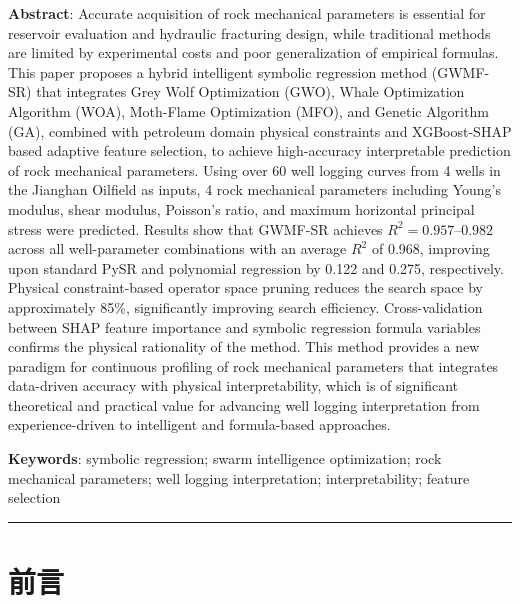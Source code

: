 \documentclass[a4paper,12pt]{ctexart}
\begin{document}
\vspace{0.5em}
\noindent\textbf{Abstract}: Accurate acquisition of rock mechanical parameters is essential for reservoir evaluation and hydraulic fracturing design, while traditional methods are limited by experimental costs and poor generalization of empirical formulas. This paper proposes a hybrid intelligent symbolic regression method (GWMF-SR) that integrates Grey Wolf Optimization (GWO), Whale Optimization Algorithm (WOA), Moth-Flame Optimization (MFO), and Genetic Algorithm (GA), combined with petroleum domain physical constraints and XGBoost-SHAP based adaptive feature selection, to achieve high-accuracy interpretable prediction of rock mechanical parameters. Using over 60 well logging curves from 4 wells in the Jianghan Oilfield as inputs, 4 rock mechanical parameters including Young's modulus, shear modulus, Poisson's ratio, and maximum horizontal principal stress were predicted. Results show that GWMF-SR achieves $R^2 = 0.957$--$0.982$ across all well-parameter combinations with an average $R^2$ of 0.968, improving upon standard PySR and polynomial regression by 0.122 and 0.275, respectively. Physical constraint-based operator space pruning reduces the search space by approximately 85\%, significantly improving search efficiency. Cross-validation between SHAP feature importance and symbolic regression formula variables confirms the physical rationality of the method. This method provides a new paradigm for continuous profiling of rock mechanical parameters that integrates data-driven accuracy with physical interpretability, which is of significant theoretical and practical value for advancing well logging interpretation from experience-driven to intelligent and formula-based approaches.

\noindent\textbf{Keywords}: symbolic regression; swarm intelligence optimization; rock mechanical parameters; well logging interpretation; interpretability; feature selection

\vspace{1em}
\noindent\rule{\textwidth}{0.4pt}


\section{前言}
\end{document}
